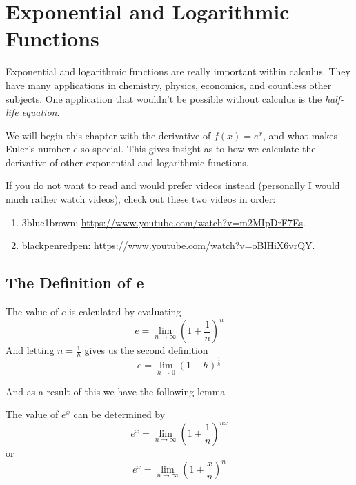 \documentclass[working]{tuftebook}
\begin{document}
\chapter{Exponential and Logarithmic Functions}
\vspace{-2em}
Exponential and logarithmic functions are really important within calculus. They have many applications in chemistry, physics, economics, and countless other subjects. One application that wouldn't be possible without calculus is the \emph{half-life equation}.

We will begin this chapter with the derivative of $f(x)=e^x$, and what makes Euler's number $e$ so special. This gives insight as to how we calculate the derivative of other exponential and logarithmic functions. 

If you do not want to read and would prefer videos instead (personally I would much rather watch videos), check out these two videos in order:
\begin{enumerate}
    \item{3blue1brown: \url{https://www.youtube.com/watch?v=m2MIpDrF7Es}.}
    \item{blackpenredpen: \url{https://www.youtube.com/watch?v=oBlHiX6vrQY}.}
\end{enumerate}

\section{The Definition of e}
\begin{definition}
        The value of $e$ is calculated by evaluating 
        \[
            e=\lim_{n\to \infty} \left( 1+ \frac{1}{n} \right)^n
        \]
        And letting $n= \frac{1}{h}$ gives us the second definition 
        \[
            e= \lim_{h\to 0} \left( 1+h \right)^ \frac{1}{h}
        \]
    \end{definition}
    And as a result of this we have the following lemma 
    \begin{lemma}
        The value of $e^x$ can be determined by 
        \[
            e^x= \lim_{n\to \infty} \left( 1+ \frac{1}{n} \right)^{nx}
        \]
        or
        \[
            e^x= \lim_{n\to \infty} \left( 1+ \frac{x}{n} \right)^n
        \]
    \end{lemma}
\end{document}
